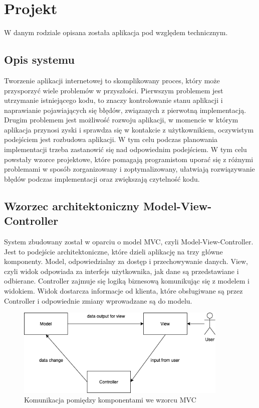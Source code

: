 \chapter{Projekt}
\thispagestyle{chapterBeginStyle}
W danym rodziale opisana została aplikacja pod względem technicznym. 

\section{Opis systemu}
Tworzenie aplikacji internetowej to skomplikowany proces, który może przysporzyć wiele problemów w przyszłości. Pierwszym problemem jest utrzymanie istniejącego kodu, to znaczy kontrolowanie stanu aplikacji i naprawianie pojawiających się błędów, związanych z pierwotną implementacją. Drugim problemem jest możliwość rozwoju aplikacji, w momencie w którym aplikacja przynosi zyski i sprawdza się w kontakcie z użytkownikiem, oczywistym podejściem jest rozbudowa aplikacji. W tym celu podczas planowania implementacji trzeba zastanowić się nad odpowiednim podejściem. W tym celu powstały wzorce projektowe, które pomagają programistom uporać się z różnymi problemami w sposób zorganizowany i zoptymalizowany, ułatwiają rozwiązywanie błędów podczas implementacji oraz zwiększają czytelność kodu.

\section{Wzorzec architektoniczny Model-View-Controller}
System zbudowany został w oparciu o model MVC, czyli Model-View-Controller.
Jest to podejście architektoniczne, które dzieli aplikację na trzy główne komponenty.
Model, odpowiedzialny za dostęp i przechowywanie danych. View, czyli widok odpowiada za interfejs użytkownika, jak dane są przedstawiane i odbierane. Controller zajmuje się logiką biznesową komunikując się z modelem i widokiem. Widok dostarcza informacje od klienta, które obsługiwane są przez Controller i odpowiednie zmiany wprowadzane są do modelu. \cite{6827095}

\begin{figure}[h]

	\centering
		\includegraphics[width=0.90\textwidth]{mvc-diagram}		
		\caption{Komunikacja pomiędzy komponentami we wzorcu MVC }
\end{figure}

